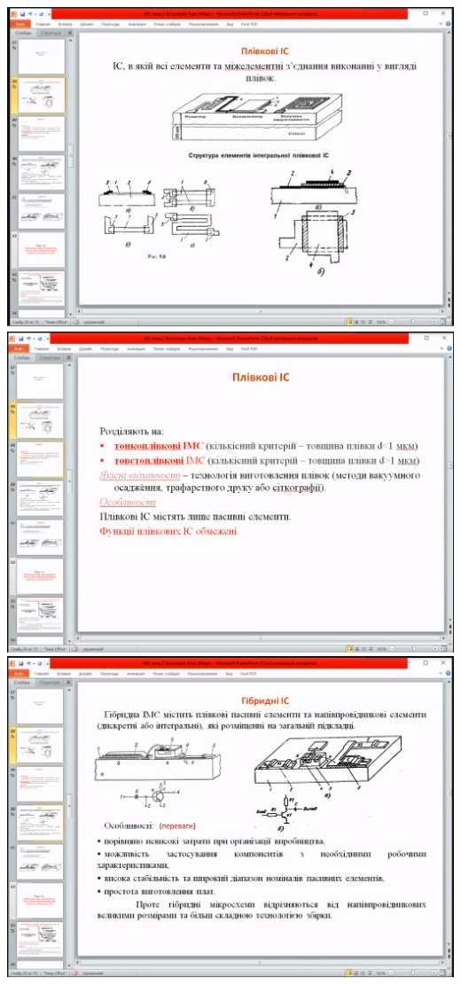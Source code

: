 \documentclass[a4paper,14pt]{extreport}
\begin{document}
\pagecolor{white}

\begin{center}
\includegraphics[scale = 0.75]{1.png}
\includegraphics[scale = 0.75]{2.png}
\includegraphics[scale = 0.75]{3.png}

\end{center}
\end{document}
